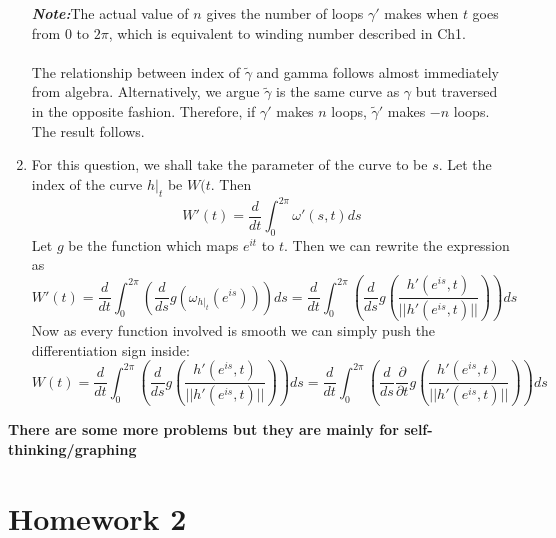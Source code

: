 \documentclass[oneside]{book}\twocolumn
\begin{document}
\begin{enumerate}
    \textbf{\textit{Note:}}The actual value of $n$ gives the number of loops $\gamma'$ makes when $t$ goes from $0$ to $2\pi$, which is equivalent to winding number described in Ch1.\\\\
    The relationship between index of $\tilde\gamma$ and gamma  follows almost immediately from algebra. Alternatively, we argue $\tilde\gamma$ is the same curve as $\gamma$ but traversed in the opposite fashion. Therefore, if $\gamma'$ makes $n$ loops, $\tilde\gamma'$ makes $-n$ loops. The result follows.
    \item For this question, we shall take the parameter of the curve to be $s$. Let the index of the curve $h|_t$ be $W(t$. Then
    $$W'(t)=\frac{d}{dt}\int_0^{2\pi}\omega'(s,t)ds$$
    Let $g$ be the function which maps $e^{it}$ to $t$. Then we can rewrite the expression as
    $$W'(t)=\frac{d}{dt}\int_0^{2\pi}\left(\frac{d}{ds}g\left(\omega_{h|_t}(e^{is})\right)\right)ds=\frac{d}{dt}\int_0^{2\pi}\left(\frac{d}{ds}g\left(\frac{h'(e^{is},t)}{||h'(e^{is},t)||}\right)\right)ds$$
    Now as every function involved is smooth we can simply push the differentiation sign inside:
    $$W(t)=\frac{d}{dt}\int_0^{2\pi}\left(\frac{d}{ds}g\left(\frac{h'(e^{is},t)}{||h'(e^{is},t)||}\right)\right)ds=\frac{d}{dt}\int_0^{2\pi}\left(\frac{d}{ds}\frac{\partial}{\partial t}g\left(\frac{h'(e^{is},t)}{||h'(e^{is},t)||}\right)\right)ds$$
\end{enumerate}
\textbf{There are some more problems but they are mainly for self-thinking/graphing}


\section{Homework 2}
\end{document}
